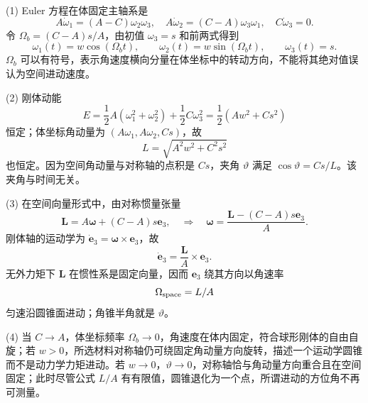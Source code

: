 (1) Euler 方程在体固定主轴系是
\[
A\dot\omega_1=(A-C)\omega_2\omega_3,\quad
A\dot\omega_2=(C-A)\omega_3\omega_1,\quad
C\dot\omega_3=0.
\]
令 \(\Omega_b=(C-A)s/A\)，由初值 \(\omega_3=s\) 和前两式得到
\[
\omega_1(t)=w\cos(\Omega_bt),\qquad
\omega_2(t)=w\sin(\Omega_bt),\qquad
\omega_3(t)=s.
\]
\(\Omega_b\) 可以有符号，表示角速度横向分量在体坐标中的转动方向，不能将其绝对值误认为空间进动速度。

(2) 刚体动能
\[
E=\frac12A(\omega_1^2+\omega_2^2)+\frac12C\omega_3^2
=\frac12(Aw^2+Cs^2)
\]
恒定；体坐标角动量为 \((A\omega_1,A\omega_2,Cs)\)，故
\[
L=\sqrt{A^2w^2+C^2s^2}
\]
也恒定。因为空间角动量与对称轴的点积是 \(Cs\)，夹角 \(\vartheta\) 满足 \(\cos\vartheta=Cs/L\)。该夹角与时间无关。

(3) 在空间向量形式中，由对称惯量张量
\[
\boldsymbol L=A\boldsymbol\omega+(C-A)s\boldsymbol e_3,
\quad\Rightarrow\quad
\boldsymbol\omega=\frac{\boldsymbol L-(C-A)s\boldsymbol e_3}{A}.
\]
刚体轴的运动学为 \(\dot{\boldsymbol e}_3=\boldsymbol\omega\times\boldsymbol e_3\)，故
\[
\dot{\boldsymbol e}_3=\frac{\boldsymbol L}{A}\times\boldsymbol e_3 .
\]
无外力矩下 \(\boldsymbol L\) 在惯性系是固定向量，因而 \(\boldsymbol e_3\) 绕其方向以角速率
\[
\Omega_{\rm space}=L/A
\]
匀速沿圆锥面进动；角锥半角就是 \(\vartheta\)。

(4) 当 \(C\to A\)，体坐标频率 \(\Omega_b\to0\)，角速度在体内固定，符合球形刚体的自由自旋；若 \(w>0\)，所选材料对称轴仍可绕固定角动量方向旋转，描述一个运动学圆锥而不是动力学力矩进动。若 \(w\to0\)，\(\vartheta\to0\)，对称轴恰与角动量方向重合且在空间固定；此时尽管公式 \(L/A\) 有有限值，圆锥退化为一个点，所谓进动的方位角不再可测量。
